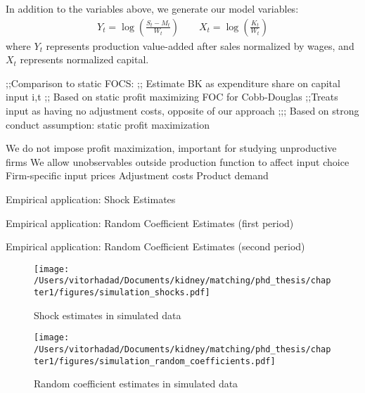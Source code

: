 In addition to the variables above, we generate our model variables:
\begin{align}
  Y_{t} = \log\left( \frac{S_{t} - M_{t}}{W_{t}}\right) \qquad X_{t} = \log \left( \frac{K_{t}}{W_{t}} \right)
\end{align}
\noindent where $Y_{t}$ represents production value-added after sales normalized by wages, and $X_t$ represents normalized capital. 


;;Comparison to static FOCS:
;; Estimate BK as expenditure share on capital input i,t
;; Based on static profit maximizing FOC for Cobb-Douglas
;;Treats input as having no adjustment costs, opposite of our
approach
;;; Based on strong conduct assumption: static profit maximization

We do not impose profit maximization, important for studying unproductive firms
We allow unobservables outside production function to affect input choice
Firm-specific input prices
Adjustment costs
Product demand


\begin{table}[H]
  \singlespacing
  \caption{Empirical application: Shock Estimates}
  
\end{table}

\begin{table}[H]
  \singlespacing
  \caption{Empirical application: Random Coefficient Estimates (first period)}
  
\end{table}

\begin{table}[H]
  \singlespacing
  \caption{Empirical application: Random Coefficient Estimates (second period)}
  
\end{table}




\begin{figure}
  \centering
  \texttt{[image: /Users/vitorhadad/Documents/kidney/matching/phd\_thesis/chapter1/figures/simulation\_shocks.pdf]}
  \label{fig:simulation_shocks}
  \caption[Shock estimates in simulated data]{Shock estimates in simulated data}
\end{figure}

\begin{figure}
  \centering
  \texttt{[image: /Users/vitorhadad/Documents/kidney/matching/phd\_thesis/chapter1/figures/simulation\_random\_coefficients.pdf]}
  \label{fig:simulation_random_coefficients}
  \caption[Random coefficient estimates in simulated data]{Random coefficient estimates in simulated data}
\end{figure}

